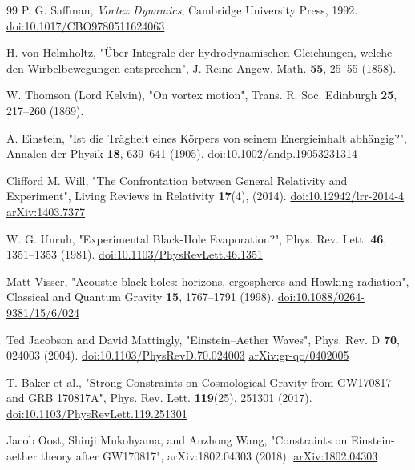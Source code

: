 \documentclass[11pt]{article}
\begin{document}
\begin{thebibliography}{99}
        P. G. Saffman,
        \textit{Vortex Dynamics},
        Cambridge University Press, 1992.
        \href{https://doi.org/10.1017/CBO9780511624063}{doi:10.1017/CBO9780511624063}

        H. von Helmholtz,
        "Über Integrale der hydrodynamischen Gleichungen, welche den Wirbelbewegungen entsprechen",
        J. Reine Angew. Math. \textbf{55}, 25--55 (1858).

        W. Thomson (Lord Kelvin),
        "On vortex motion",
        Trans. R. Soc. Edinburgh \textbf{25}, 217--260 (1869).

        A. Einstein,
        "Ist die Trägheit eines Körpers von seinem Energieinhalt abhängig?",
        Annalen der Physik \textbf{18}, 639--641 (1905).
        \href{https://doi.org/10.1002/andp.19053231314}{doi:10.1002/andp.19053231314}

        Clifford M. Will,
        "The Confrontation between General Relativity and Experiment",
        Living Reviews in Relativity \textbf{17}(4), (2014).
        \href{https://doi.org/10.12942/lrr-2014-4}{doi:10.12942/lrr-2014-4}
        \href{https://arxiv.org/abs/1403.7377}{arXiv:1403.7377}

        W. G. Unruh,
        "Experimental Black-Hole Evaporation?",
        Phys. Rev. Lett. \textbf{46}, 1351--1353 (1981).
        \href{https://doi.org/10.1103/PhysRevLett.46.1351}{doi:10.1103/PhysRevLett.46.1351}

        Matt Visser,
        "Acoustic black holes: horizons, ergospheres and Hawking radiation",
        Classical and Quantum Gravity \textbf{15}, 1767--1791 (1998).
        \href{https://doi.org/10.1088/0264-9381/15/6/024}{doi:10.1088/0264-9381/15/6/024}

        Ted Jacobson and David Mattingly,
        "Einstein–Aether Waves",
        Phys. Rev. D \textbf{70}, 024003 (2004).
        \href{https://doi.org/10.1103/PhysRevD.70.024003}{doi:10.1103/PhysRevD.70.024003}
        \href{https://arxiv.org/abs/gr-qc/0402005}{arXiv:gr-qc/0402005}

        T. Baker et al.,
        "Strong Constraints on Cosmological Gravity from GW170817 and GRB 170817A",
        Phys. Rev. Lett. \textbf{119}(25), 251301 (2017).
        \href{https://doi.org/10.1103/PhysRevLett.119.251301}{doi:10.1103/PhysRevLett.119.251301}

        Jacob Oost, Shinji Mukohyama, and Anzhong Wang,
        "Constraints on Einstein-aether theory after GW170817",
        arXiv:1802.04303 (2018).
        \href{https://arxiv.org/abs/1802.04303}{arXiv:1802.04303}
    \end{thebibliography}
\end{document}
